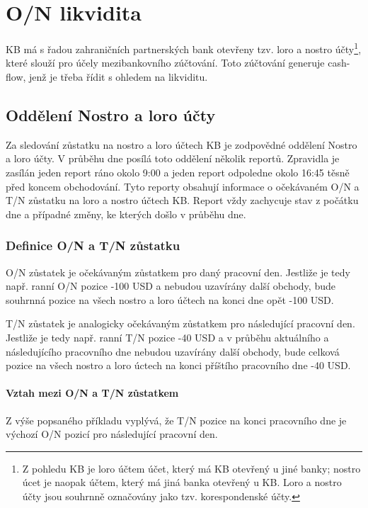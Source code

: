 \documentclass[a4paper]{book}
\begin{document}
\chapter{O/N likvidita}

KB má s řadou zahraničních partnerských bank otevřeny tzv. loro a nostro účty\footnote{Z pohledu KB je loro účtem účet, který má KB otevřený u jiné banky; nostro úcet je naopak účtem, který má jiná banka otevřený u KB. Loro a nostro účty jsou souhrnně označovány jako tzv. korespondenské účty.}, které slouží pro účely mezibankovního zúčtování. Toto zúčtování generuje cash-flow, jenž je třeba řídit s ohledem na likviditu.

\section{Oddělení Nostro a loro účty}

Za sledování zůstatku na nostro a loro účtech KB je zodpovědné oddělení Nostro a loro účty. V průběhu dne posílá toto oddělení několik reportů. Zpravidla je zasílán jeden report ráno okolo 9:00 a jeden report odpoledne okolo 16:45 těsně před koncem obchodování. Tyto reporty obsahují informace o očekávaném O/N a T/N zůstatku na loro a nostro účtech KB. Report vždy zachycuje stav z počátku dne a případné změny, ke kterých došlo v průběhu dne.

\subsection{Definice O/N a T/N zůstatku}

O/N zůstatek je očekávaným zůstatkem pro daný pracovní den. Jestliže je tedy např. ranní O/N pozice -100 USD a nebudou uzavírány další obchody, bude souhrnná pozice na všech nostro a loro účtech na konci dne opět -100 USD.

T/N zůstatek je analogicky očekávaným zůstatkem pro následující pracovní den. Jestliže je tedy např. ranní T/N pozice -40 USD a v průběhu aktuálního a následujícího pracovního dne nebudou uzavírány další obchody, bude celková pozice na všech nostro a loro úctech na konci příštího pracovního dne -40 USD.

\subsubsection{Vztah mezi O/N a T/N zůstatkem}

Z výše popsaného příkladu vyplývá, že T/N pozice na konci pracovního dne je výchozí O/N pozicí pro následující pracovní den.
\end{document}
